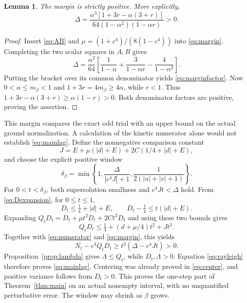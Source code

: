 \documentclass[11pt]{article}
\newtheorem{lemma}[theorem]{Lemma}
\begin{document}
\begin{lemma}\label{lem:margin}
The margin is strictly positive. More explicitly,
\begin{equation}\label{eq:marginfactor}
 \Delta=\frac{\alpha^3[1+3r-\alpha(3+r)]}
 {64(1-\alpha^2)(1-\alpha r)}>0.
\end{equation}
\end{lemma}
\begin{proof}
Insert \eqref{eq:AB} and $\mu=(1+c^4)/(8(1-c^4))$ into
\eqref{eq:margin}. Completing the two scalar squares in $A,B$ gives
\[
 \Delta=\frac{\alpha^2}{64}
 \left[\frac1{1-\alpha}+\frac3{1-\alpha r}
                    -\frac4{1-\alpha^2}\right].
\]
Putting the bracket over its common denominator yields
\eqref{eq:marginfactor}. Now $0<\alpha\leq m_\beta<1$ and
$1+3r=4m_\beta\geq4\alpha$, while $r<1$. Thus
$1+3r-\alpha(3+r)\geq\alpha(1-r)>0$.
Both denominator factors are positive, proving the assertion.
\end{proof}

This margin compares the exact odd trial with an upper bound on the
actual ground normalization. A calculation of the kinetic numerator
alone would not establish \eqref{eq:mainlag}.
Define the nonnegative comparison constant
\begin{equation}\label{eq:comparisonconstant}
 J=E+\mu(|d|+E)+2C(1/4+|d|+E),
\end{equation}
and choose the explicit positive window
\begin{equation}\label{eq:delta}
 \delta_\beta=\min\left\{1,\frac{\Delta}{|c^4J|+1},
                     \frac1{2(|u|+|v|+1)}\right\}.
\end{equation}
For $0<t<\delta_\beta$, both supersolution smallness and
$c^4Jt<\Delta$ hold. From \eqref{eq:Dexpansion}, for $0\leq t\leq1$,
\[
 D_t\leq\tfrac14+|d|+E,\qquad
 D_t-\tfrac14\leq t(|d|+E).
\]
Expanding $Q_tD_t=D_t+\mu t^2D_t+2Ct^3D_t$ and using these two
bounds gives
\begin{equation}\label{eq:QD}
 Q_tD_t\leq\tfrac14+(d+\mu/4)t^2+Jt^3.
\end{equation}
Together with \eqref{eq:numerator} and \eqref{eq:margin}, this yields
\[
 N_t-c^4Q_tD_t\geq t^2(\Delta-c^4Jt)>0.
\]
Proposition~\ref{prop:lambda} gives $\Lambda\leq Q_t$, while
$D_t,\Lambda>0$. Equation \eqref{eq:rayleigh} therefore proves
\eqref{eq:mainlag}. Centering was already proved in \eqref{eq:center},
and positive variance follows from $D_t>0$. This proves the one-step
part of Theorem~\ref{thm:main} on an actual nonempty interval, with no
unquantified perturbative error. The window may shrink as $\beta$ grows.
\end{document}
